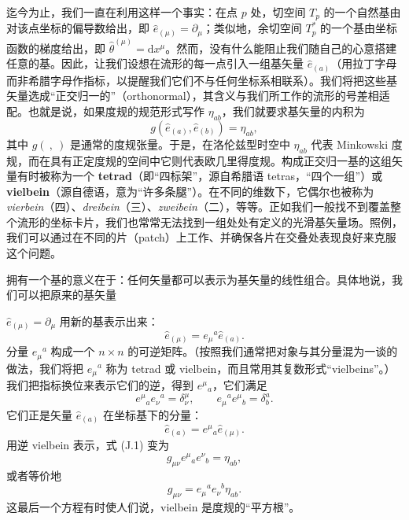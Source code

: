 迄今为止，我们一直在利用这样一个事实：在点 $p$ 处，切空间 $T_{p}$ 的一个自然基由对该点坐标的偏导数给出，即 $\hat{e}_{(\mu)} = \partial_{\mu}$；类似地，余切空间 $T_{p}^{*}$ 的一个基由坐标函数的梯度给出，即 $\hat{\theta}^{(\mu)} = \mathrm{d}x^{\mu}$。然而，没有什么能阻止我们随自己的心意搭建任意的基。因此，让我们设想在流形的每一点引入一组基矢量 $\hat{e}_{(a)}$（用拉丁字母而非希腊字母作指标，以提醒我们它们不与任何坐标系相联系）。我们将把这些基矢量选成“正交归一的”（orthonormal），其含义与我们所工作的流形的号差相适配。也就是说，如果度规的规范形式写作 $\eta_{ab}$，我们就要求基矢量的内积为
\begin{equation*}
g(\hat{e}_{(a)}, \hat{e}_{(b)}) = \eta_{ab},
\tag{J.1}
\end{equation*}
其中 $g(\ ,\ )$ 是通常的度规张量。于是，在洛伦兹型时空中 $\eta_{ab}$ 代表 Minkowski 度规，而在具有正定度规的空间中它则代表欧几里得度规。构成正交归一基的这组矢量有时被称为一个 \textbf{tetrad}（即“四标架”，源自希腊语 tetras，“四个一组”）或 \textbf{vielbein}（源自德语，意为“许多条腿”）。在不同的维数下，它偶尔也被称为 \emph{vierbein}（四）、\emph{dreibein}（三）、\emph{zweibein}（二），等等。正如我们一般找不到覆盖整个流形的坐标卡片，我们也常常无法找到一组处处有定义的光滑基矢量场。照例，我们可以通过在不同的片（patch）上工作、并确保各片在交叠处表现良好来克服这个问题。

拥有一个基的意义在于：任何矢量都可以表示为基矢量的线性组合。具体地说，我们可以把原来的基矢量

$\hat{e}_{(\mu)} = \partial_{\mu}$ 用新的基表示出来：
\begin{equation*}
\hat{e}_{(\mu)} = e_{\mu}{}^{a}\hat{e}_{(a)}.
\tag{J.2}
\end{equation*}
分量 $e_{\mu}{}^{a}$ 构成一个 $n\times n$ 的可逆矩阵。（按照我们通常把对象与其分量混为一谈的做法，我们将把 $e_{\mu}{}^{a}$ 称为 tetrad 或 vielbein，而且常用其复数形式“vielbeins”。）我们把指标换位来表示它们的逆，得到 $e^{\mu}{}_{a}$，它们满足
\begin{equation*}
e^{\mu}{}_{a}e_{\nu}{}^{a} = \delta^{\mu}_{\nu}, \qquad e_{\mu}{}^{a}e^{\mu}{}_{b} = \delta^{a}_{b}.
\tag{J.3}
\end{equation*}
它们正是矢量 $\hat{e}_{(a)}$ 在坐标基下的分量：
\begin{equation*}
\hat{e}_{(a)} = e^{\mu}{}_{a}\hat{e}_{(\mu)}.
\tag{J.4}
\end{equation*}
用逆 vielbein 表示，式 (J.1) 变为
\begin{equation*}
g_{\mu\nu}e^{\mu}{}_{a}e^{\nu}{}_{b} = \eta_{ab},
\tag{J.5}
\end{equation*}
或者等价地
\begin{equation*}
g_{\mu\nu} = e_{\mu}{}^{a}e_{\nu}{}^{b}\eta_{ab}.
\tag{J.6}
\end{equation*}
这最后一个方程有时使人们说，vielbein 是度规的“平方根”。

